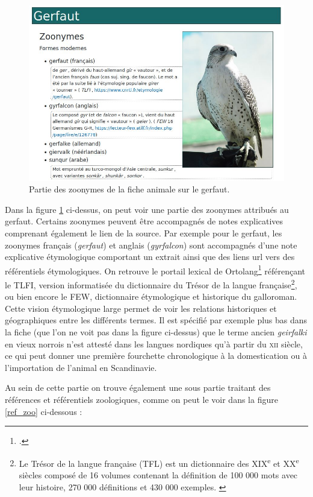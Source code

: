 \documentclass[a4paper,12pt,twoside]{book}
\begin{document}
\begin{figure}[H]
    \centering
    \includegraphics[width=12cm]{img/partie_3/gerfaut.JPG}
    \caption{Partie des zoonymes de la fiche animale sur le gerfaut.}
    \label{gerfaut}
\end{figure}

Dans la figure \ref{gerfaut} ci-dessus, on peut voir une partie des zoonymes attribués au gerfaut. Certains zoonymes peuvent être accompagnés de notes explicatives comprenant également le lien de la source. Par exemple pour le gerfaut, les zoonymes français (\textit{gerfaut}) et anglais (\textit{gyrfalcon}) sont accompagnés d'une note explicative étymologique comportant un extrait ainsi que des liens url vers des référentiels étymologiques. On retrouve le portail lexical de Ortolang\footcite{ortolang} référençant le \acrfull{TLFI}, version informatisée du dictionnaire du Trésor de la langue française\footnote{Le Trésor de la langue française (TFL) est un dictionnaire des XIX\textsuperscript{e} et XX\textsuperscript{e} siècles composé de 16 volumes contenant la définition de 100 000 mots avec leur histoire, 270 000 définitions et 430 000 exemples. \cite{tlfi}}, ou bien encore le \acrfull{FEW}, dictionnaire étymologique et historique du galloroman. Cette vision étymologique large permet de voir les relations historiques et géographiques entre les différents termes. Il est spécifié par exemple plus bas dans la fiche (que l'on ne voit pas dans la figure ci-dessus) que le terme ancien \textit{geirfalki} en vieux norrois n'est attesté dans les langues nordiques qu'à partir du \textsc{xii}\ieme{} siècle, ce qui peut donner une première fourchette chronologique à la domestication ou à l'importation de l'animal en Scandinavie.


Au sein de cette partie on trouve également une sous partie traitant des références et référentiels zoologiques, comme on peut le voir dans la figure \ref{ref_zoo} ci-dessous :
\end{document}

